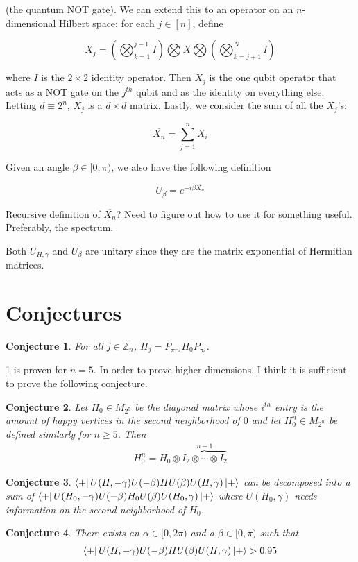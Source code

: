 \documentclass[10pt]{article}
\newtheorem{conjecture}{Conjecture}
\begin{document}
\noindent (the quantum NOT gate). We can extend this to an operator on an $n$-dimensional Hilbert space: for each $j \in [n]$, define 

\begin{equation}
    X_j = \left( \bigotimes_{k = 1}^{j - 1} I \right) \bigotimes X \bigotimes \left( \bigotimes_{k = j+1}^{N} I \right)
\end{equation}

\noindent where $I$ is the $2 \times 2$ identity operator. Then $X_j$ is the one qubit operator that acts as a NOT gate on the $j^{th}$ qubit and as the identity on everything else. Letting $d \equiv 2^n$, $X_j$ is a $d \times d$ matrix. Lastly, we consider the sum of all the $X_j$'s:

\begin{equation}
    \overline{X_n} = \sum_{j = 1}^n X_i
\end{equation}

Given an angle $\beta \in [0,\pi)$, we also have the following definition

\begin{equation}
    U_{\beta} = e^{-i\beta \overline{X_n}}
\end{equation}

Recursive definition of $\overline{X_n}$? Need to figure out how to use it for something useful. Preferably, the spectrum.

\noindent Both $U_{H, \gamma}$ and $U_{\beta}$ are unitary since they are the matrix exponential of Hermitian matrices.

\section*{Conjectures}
\begin{conjecture}
For all $j \in \mathbb{Z}_n$, $H_j = P_{\pi^{-j}} H_0 P_{\pi^j}$.
\end{conjecture}
1 is proven for $n=5$. In order to prove higher dimensions, I think it is sufficient to prove the following conjecture.
\begin{conjecture}
Let $H_0 \in M_{2^5}$ be the diagonal matrix whose $i^{th}$ entry is the amount of happy vertices in the second neighborhood of $0$ and let $H_0^n \in M_{2^n}$ be defined similarly for $n \geq 5$. Then
\begin{align*}
    H_0^n = H_0 \otimes \overbrace{I_2 \otimes \cdots \otimes I_2}^{n-1}
\end{align*}
\end{conjecture}

\begin{conjecture}
$\bra{+}U(H, -\gamma) U(-\beta) H U(\beta)U(H, \gamma)\ket{+}$ can be decomposed into a sum of $\bra{+}U(H_0, -\gamma) U(-\beta) H_0 U(\beta)U(H_0, \gamma)\ket{+}$ where $U(H_0, \gamma)$ needs information on the second neighborhood of $H_0$.
\end{conjecture}

\begin{conjecture}
There exists an $\alpha \in [0,2\pi)$ and a $\beta \in [0,\pi)$ such that 
\begin{align*}
    \bra{+}U(H, -\gamma) U(-\beta) H U(\beta)U(H, \gamma)\ket{+} > 0.95
\end{align*}
\end{conjecture}
\end{document}
